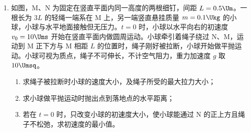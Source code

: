 \documentclass[\gkver]{gaokaozhenti}
\begin{document}
\begin{enumerate}
{要使激光能在圆心 $O$ 点发生全反射，激光必须指向 $O$ 点射入，如图所示。只要入射角大于 $45^{\circ}$，即可发生全反射，则使激光能在圆心 $O$ 点发生全反射，入射光线与 $x$ 轴之间夹角的范围 $(0, 45^{\circ}]$。由对称性可知，入射光线与 $x$ 轴之间夹角的范围还可以为 $[135^{\circ}, 180^{\circ})$。
}

\item
如图，M、N 为固定在竖直平面内同一高度的两根细钉，间距 $L = 0.5 \Um$。一根长为 $3L$ 的轻绳一端系在 M 上，另一端竖直悬挂质量 $m = 0.1 \Ukg$ 的小球，小球与水平地面接触但无压力。$t = 0$ 时，小球以水平向右的初速度 $v_{0} = 10 \Ums$ 开始在竖直平面内做圆周运动。小球牵引着绳子绕过 N、M，运动到 M 正下方与 M 相距 $L$ 的位置时，绳子刚好被拉断，小球开始做平抛运动。小球可视为质点，绳子不可伸长，不计空气阻力，重力加速度 $g$ 取 $10 \Umsq$。
\begin{enumerate}
\item
求绳子被拉断时小球的速度大小，及绳子所受的最大拉力大小；
\item
求小球做平抛运动时抛出点到落地点的水平距离；
\item
若在 $t = 0$ 时，只改变小球的初速度大小，使小球能通过 N 的正上方且绳子不松弛，求初速度的最小值。
\end{enumerate}

\onepicture[align=right, w=6.21cm]{}

\end{enumerate}
\end{document}
